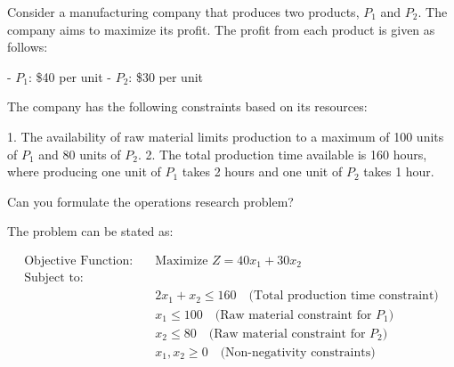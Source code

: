\Exercise[label={ex:OR1},title={coses}] 
Consider a manufacturing company that produces two products, \( P_1 \) and \( P_2 \). The company aims to maximize its profit. The profit from each product is given as follows: 

- \( P_1 \): \$40 per unit
- \( P_2 \): \$30 per unit

The company has the following constraints based on its resources:

1. The availability of raw material limits production to a maximum of 100 units of \( P_1 \) and 80 units of \( P_2 \).
2. The total production time available is 160 hours, where producing one unit of \( P_1 \) takes 2 hours and one unit of \( P_2 \) takes 1 hour.

Can you formulate the operations research problem?

\Answer 

The problem can be stated as:

\begin{align*}
\text{Objective Function:} & \quad \text{Maximize } Z = 40x_1 + 30x_2 \\
\text{Subject to:} & \\
& \quad 2x_1 + x_2 \leq 160 \quad \text{(Total production time constraint)} \\
& \quad x_1 \leq 100 \quad \text{(Raw material constraint for } P_1\text{)} \\
& \quad x_2 \leq 80 \quad \text{(Raw material constraint for } P_2\text{)} \\
& \quad x_1, x_2 \geq 0 \quad \text{(Non-negativity constraints)}
\end{align*}

\blacksquare